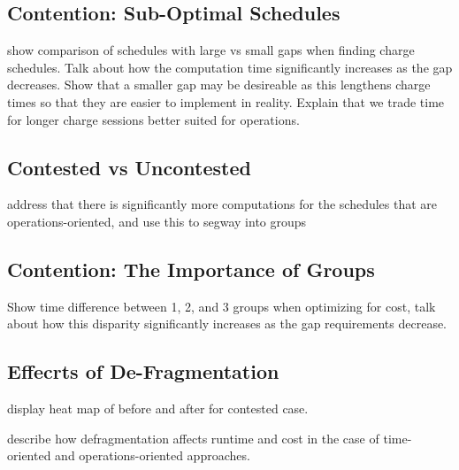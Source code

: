 \subsection{Contention: Sub-Optimal Schedules}
show comparison of schedules with large vs small gaps when finding charge schedules. Talk about how the computation time significantly increases as the gap decreases. Show that a smaller gap may be desireable as this lengthens charge times so that they are easier to implement in reality. Explain that we trade time for longer charge sessions better suited for operations.



\subsection{Contested vs Uncontested}
address that there is significantly more computations for the schedules that are operations-oriented, and use this to segway into groups


%
%
%

\subsection{Contention: The Importance of Groups}
Show time difference between 1, 2, and 3 groups when optimizing for cost, talk about how this disparity significantly increases as the gap requirements decrease.

\subsection{Effecrts of De-Fragmentation}
display heat map of before and after for contested case.



describe how defragmentation affects runtime and cost in the case of time-oriented and operations-oriented approaches.





	
	
